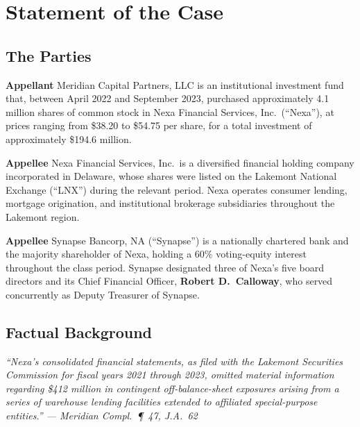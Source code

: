 \documentclass[12pt]{article}
\newcommand{\emphasis}[1]{\textbf{\color{NavyDeep}#1}}
\begin{document}

\section{Statement of the Case}

\subsection{The Parties}

\emphasis{Appellant} Meridian Capital Partners, LLC is an institutional investment fund that,
between April 2022 and September 2023, purchased approximately 4.1 million shares of
common stock in Nexa Financial Services, Inc.\ (``Nexa''), at prices ranging from
\$38.20 to \$54.75 per share, for a total investment of approximately \$194.6 million.

\emphasis{Appellee} Nexa Financial Services, Inc.\ is a diversified financial holding
company incorporated in Delaware, whose shares were listed on the Lakemont National
Exchange (``LNX'') during the relevant period. Nexa operates consumer lending, mortgage
origination, and institutional brokerage subsidiaries throughout the Lakemont region.

\emphasis{Appellee} Synapse Bancorp, NA (``Synapse'') is a nationally chartered bank and
the majority shareholder of Nexa, holding a 60\% voting-equity interest throughout
the class period. Synapse designated three of Nexa's five board directors and
its Chief Financial Officer, \textbf{Robert D.\ Calloway}, who served concurrently as
Deputy Treasurer of Synapse.

\subsection{Factual Background}

\begin{tcolorbox}[quotebox]
\small\itshape
``Nexa's consolidated financial statements, as filed with the Lakemont Securities Commission
for fiscal years 2021 through 2023, omitted material information regarding
\$412 million in contingent off-balance-sheet exposures arising from a series of
warehouse lending facilities extended to affiliated special-purpose entities.''
--- Meridian Compl.\ \P\ 47, J.A.\ 62
\end{tcolorbox}
\end{document}
